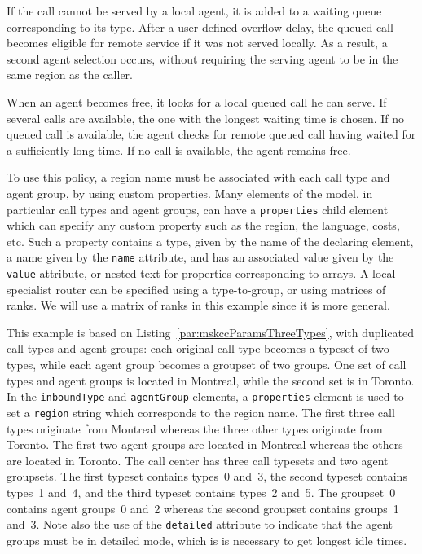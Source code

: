 If the call cannot be served by a local agent, it is added to a
waiting queue corresponding to its type.  After a user-defined
overflow delay, the queued call becomes eligible for remote service if
it was not served locally.  As a result, a second agent selection
occurs, without requiring the serving agent to be in the same region
as the caller.

When an agent becomes free, it looks for a local queued call
he can serve.  If several calls are available, the one with the
longest waiting time is chosen.  If no queued call is available, the
agent checks for remote queued call having waited for a sufficiently
long time.  If no call is available, the agent remains free.

To use this policy, a region name must be associated with each call type
and agent group, by using custom properties.
Many elements of the model, in particular
call types and agent groups, can have a
\texttt{properties} child element which can specify any custom
property such as the region, the language, costs, etc.
Such a property contains a type, given by the name of the declaring element,
a name given by the \texttt{name} attribute, and has
an associated value
given by the \texttt{value} attribute, or nested text for
properties corresponding to arrays.
A local-specialist router can be specified using a type-to-group,
or using matrices of ranks.
We will use a matrix of ranks in this example since it is more general.



This example is based on Listing~\ref{par:mskccParamsThreeTypes}, with
duplicated call types and
agent groups:  each original call type becomes a typeset
of two types,
while each
agent group becomes a groupset of two groups.
One set of call types and agent groups is located in
Montreal, while the second set is in Toronto.
In the \texttt{inbound\-Type} and \texttt{agent\-Group} elements, a
\texttt{properties} element is used to set a \texttt{region} string
which corresponds to the region name.
The first three call types originate from Montreal whereas the three
other types originate from Toronto.
The first two agent groups are located in Montreal whereas the others
are located in Toronto.
The call center has three call typesets and two agent groupsets.
The first typeset contains types~0 and~3, the second typeset contains
types~1 and~4, and the third typeset contains types~2 and~5.
The groupset~0 contains agent groups~0 and~2 whereas the second groupset
contains groups~1 and~3.
Note also the use of the \texttt{detailed} attribute to indicate that
the agent groups must be in detailed mode, which is is necessary to
get longest idle times.

